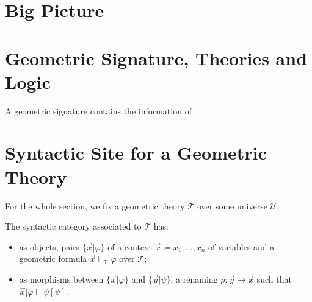%


\section{Big Picture}


\section{Geometric Signature, Theories and Logic}

\begin{definition}
A geometric signature contains the information of 
\end{definition}

\section{Syntactic Site for a Geometric Theory}

\newcommand{\thT}{\ensuremath{\mathcal{T}}}
\newcommand{\fmlInCtx}[2]{\{ #1 | #2 \}}
\newcommand{\subs}[2]{{#1}[{#1}]}
\newcommand{\Univ}{\ensuremath{\mathscr{U}}}
\newcommand{\quot}{\text{quot}}
\newcommand{\vxz}{\vec{x}+\vec{z}}
\newcommand{\iotas}{\ensuremath{[\iota_1,\iota_2]}}

For the whole section, we fix a geometric theory \thT{} over some universe \Univ{}.


\begin{definition}
  \leanok
  The syntactic category associated to $\mathcal{T}$ has:
  \begin{itemize}
    \item as objects, pairs $\fmlInCtx{\vec{x}}{\varphi}$ of a context $\vec{x} \coloneq x_1, \ldots, x_{n}$ of variables and a geometric formula $\vec{x} \vdash_{\thT} \varphi$ over \thT{};
    \item as morphisms between $\fmlInCtx{\vec{x}}{\varphi}$ and $\fmlInCtx{\vec{y}}{\psi}$, a renaming $\rho : \vec{y} \to \vec{x}$ such that $\vec{x} | \varphi \vdash \subs{\psi}{\rho}$.
  \end{itemize}
\end{definition}

